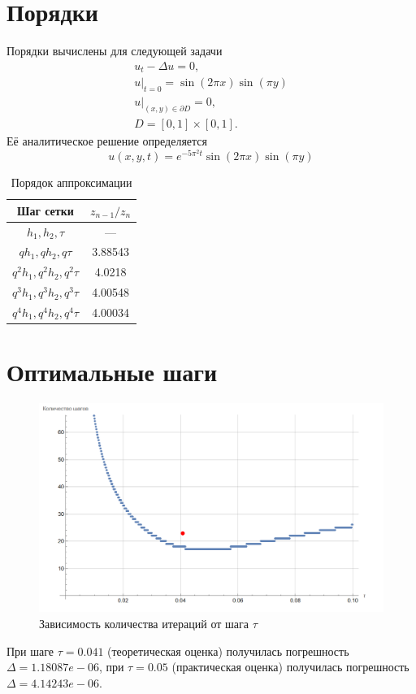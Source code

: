 \documentclass{article}
\begin{document}
	\section{Порядки}
	Порядки вычислены для следующей задачи
	\begin{gather*}
		u_t - \Delta u = 0, \\ 
		u|_{t=0} = \sin(2 \pi x) \sin(\pi y)\\
		u|_{(x,y) \in \partial D} = 0, \\
		D = [0,1] \times  [0,1].
	\end{gather*}
	Её аналитическое решение определяется 
	\begin{equation*}
		u(x,y, t) = e^{-5\pi^2 t} \sin(2\pi x) \sin(\pi y)
	\end{equation*}
	\begin{table}[H]
		\centering
		\caption{Порядок аппроксимации}
		\begin{tabular}{|c|c|}
			\hline
			Шаг сетки & $z_{n-1} / z_n$ \\ \hline
			$h_1, h_2, \tau$ & --- \\ \hline 
			$q h_1, q h_2, q \tau$ &  3.88543 \\ \hline 
			$q^2 h_1, q^2 h_2,  q^2 \tau$ & 4.0218 \\ \hline 
			$q^3 h_1, q^3 h_2, q^3 \tau$ & 4.00548 \\ \hline 
			$q^4 h_1,q^4 h_2, q^{4} \tau$ & 4.00034 \\ \hline 
	
		\end{tabular}
	\end{table}
	\section{Оптимальные шаги}
	\begin{figure}[H]
        \centering
        \includegraphics[width=\textwidth]{optimal_step.png}
        \caption{Зависимость количества итераций от шага $\tau$}
    \end{figure}
	При шаге $\tau = 0.041$ (теоретическая оценка) получилась погрешность 
	$\Delta = 1.18087e-06$, при $\tau = 0.05$ (практическая оценка) получилась 
	погрешность $\Delta = 4.14243e-06$.
\end{document}
